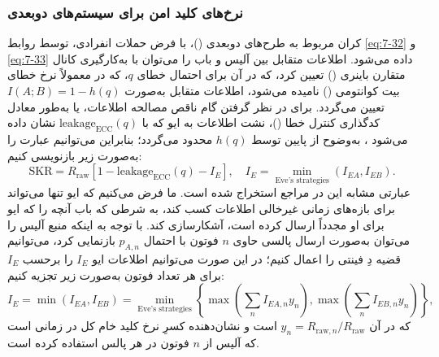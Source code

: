 \subsubsection{نرخ‌های کلید امن برای سیستم‌های  دوبعدی}
\label{subsec:7-4-3}
کران مربوط به طرح‌های  دوبعدی ()، با فرض حملات انفرادی، توسط روابط \eqref{eq:7-32} و \eqref{eq:7-33} داده می‌شود. اطلاعات متقابل بین آلیس و باب را می‌توان با به‌کارگیری کانال متقارن باینری () تعیین کرد، که در آن برای احتمال خطای $q$، که در  معمولاً نرخ خطای بیت کوانتومی () نامیده می‌شود، اطلاعات متقابل به‌صورت $I(A; B) = 1 - h(q)$ تعیین می‌گردد. برای در نظر گرفتن گام ناقص مصالحه اطلاعات، یا به‌طور معادل کدگذاری کنترل خطا ()، نشت اطلاعات  به ایو که با $\text{leakage}_{\text{ECC}}(q)$ نشان داده می‌شود \cite{7-46}، به‌وضوح از پایین توسط $h(q)$ محدود می‌گردد؛ بنابراین می‌توانیم عبارت  را به‌صورت زیر بازنویسی کنیم:
\begin{equation}
	\text{SKR} = R_{\text{raw}} [1 - \text{leakage}_{\text{ECC}}(q) - I_E], \quad I_E = \min_{\text{Eve's strategies}} (I_{EA}, I_{EB}).
	\label{eq:7-57}
\end{equation}
عبارتی مشابه این در مراجع \cite{7-65, 7-66, 7-67, 7-68} استخراج شده است. ما فرض می‌کنیم که ایو تنها می‌تواند برای بازه‌های زمانی غیرخالی اطلاعات کسب کند، به شرطی که باب آنچه را که ایو برای او مجدداً ارسال کرده است، آشکارسازی کند. با توجه به اینکه منبع آلیس را می‌توان به‌صورت ارسال پالسی حاوی $n$ فوتون با احتمال $p_{A,n}$ بازنمایی کرد، می‌توانیم قضیه دِ فینتی \cite{7-61} را اعمال کنیم؛ در این صورت می‌توانیم اطلاعات ایو $I_E$ را برحسب $I_E$ برای هر تعداد فوتون به‌صورت زیر تجزیه کنیم:
\begin{equation}
	I_E = \min(I_{EA}, I_{EB}) = \min_{\text{Eve's strategies}} \left\{ \max \left( \sum_n I_{EA,n} y_n \right), \max \left( \sum_n I_{EB,n} y_n \right) \right\},
	\label{eq:7-58}
\end{equation}
که در آن $y_n = R_{\text{raw},n}/R_{\text{raw}}$ است و نشان‌دهنده کسرِ نرخ کلید خام کل در زمانی است که آلیس از $n$ فوتون در هر پالس استفاده کرده است.






